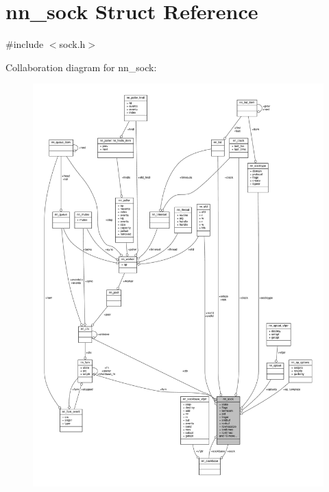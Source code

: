 \hypertarget{structnn__sock}{}\section{nn\+\_\+sock Struct Reference}
\label{structnn__sock}


{\ttfamily \#include $<$sock.\+h$>$}



Collaboration diagram for nn\+\_\+sock\+:\nopagebreak
\begin{figure}[H]
\begin{center}
\leavevmode
\includegraphics[width=350pt]{structnn__sock__coll__graph}
\end{center}
\end{figure}
